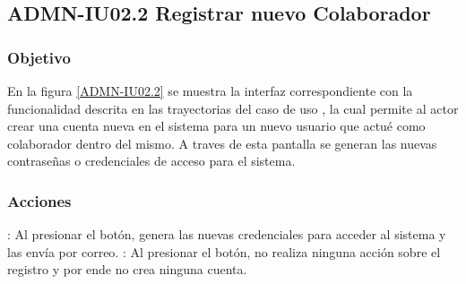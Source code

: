 \clearpage
\subsection{ADMN-IU02.2 Registrar nuevo Colaborador}

\subsubsection{Objetivo}
En la figura \ref{ADMN-IU02.2} se muestra la interfaz correspondiente con la funcionalidad descrita en las
trayectorias del caso de uso , la cual permite al actor crear una cuenta nueva en el sistema para un nuevo usuario que actué como colaborador
dentro del mismo.
A traves de esta pantalla se generan las nuevas contraseñas o credenciales de acceso para el sistema.

\subsubsection{Acciones}
\Titem {} : Al presionar el botón, genera las nuevas credenciales para acceder al sistema y las envía por correo.
\Titem {} : Al presionar el botón, no realiza ninguna acción sobre el registro y por ende no crea ninguna cuenta.



\clearpage

